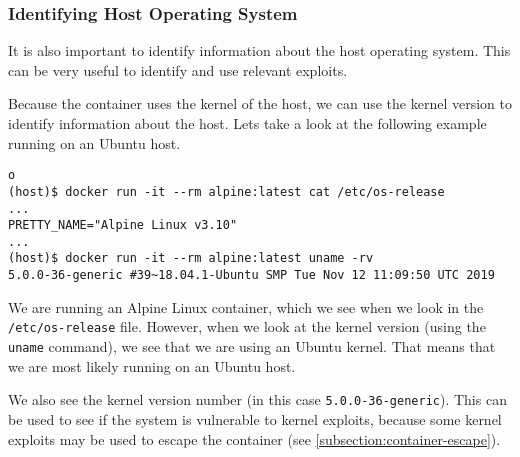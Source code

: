 \subsubsection{Identifying Host Operating System}
It is also important to identify information about the host operating system. This can be very useful to identify and use relevant exploits. 

Because the container uses the kernel of the host, we can use the kernel version to identify information about the host. Lets take a look at the following example running on an Ubuntu host.
\begin{lstlisting}o
(host)$ docker run -it --rm alpine:latest cat /etc/os-release 
...
PRETTY_NAME="Alpine Linux v3.10"
...
(host)$ docker run -it --rm alpine:latest uname -rv
5.0.0-36-generic #39~18.04.1-Ubuntu SMP Tue Nov 12 11:09:50 UTC 2019
\end{lstlisting}

We are running an Alpine Linux container, which we see when we look in the \lstinline{/etc/os-release} file. However, when we look at the kernel version (using the \lstinline{uname} command), we see that we are using an Ubuntu kernel. That means that we are most likely running on an Ubuntu host.

\hfill

We also see the kernel version number (in this case \lstinline{5.0.0-36-generic}). This can be used to see if the system is vulnerable to kernel exploits, because some kernel exploits may be used to escape the container (see \autoref{subsection:container-escape}).
